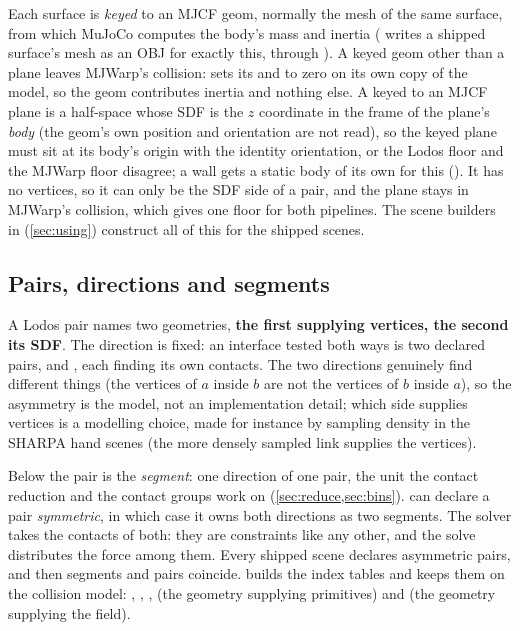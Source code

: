 Each surface is \emph{keyed} to an MJCF geom, normally the mesh of the same surface, from which MuJoCo computes the body's mass and inertia ( writes a shipped surface's mesh as an OBJ for exactly this, through ). A keyed geom other than a plane leaves MJWarp's collision:  sets its  and  to zero on its own copy of the model, so the geom contributes inertia and nothing else. A  keyed to an MJCF plane is a half-space whose SDF is the $z$ coordinate in the frame of the plane's \emph{body} (the geom's own position and orientation are not read), so the keyed plane must sit at its body's origin with the identity orientation, or the Lodos floor and the MJWarp floor disagree; a wall gets a static body of its own for this (). It has no vertices, so it can only be the SDF side of a pair, and the plane stays in MJWarp's collision, which gives one floor for both pipelines. The scene builders in  (\cref{sec:using}) construct all of this for the shipped scenes.

\subsection{Pairs, directions and segments}\label{sec:pairs}

A Lodos pair names two geometries, \textbf{the first supplying vertices, the second its SDF}. The direction is fixed: an interface tested both ways is two declared pairs,  and , each finding its own contacts. The two directions genuinely find different things (the vertices of $a$ inside $b$ are not the vertices of $b$ inside $a$), so the asymmetry is the model, not an implementation detail; which side supplies vertices is a modelling choice, made for instance by sampling density in the SHARPA hand scenes (the more densely sampled link supplies the vertices).

Below the pair is the \emph{segment}: one direction of one pair, the unit the contact reduction and the contact groups work on (\cref{sec:reduce,sec:bins}).  can declare a pair \emph{symmetric}, in which case it owns both directions as two segments. The solver takes the contacts of both: they are constraints like any other, and the solve distributes the force among them. Every shipped scene declares asymmetric pairs, and then segments and pairs coincide.  builds the index tables and keeps them on the collision model: , , ,  (the geometry supplying primitives) and  (the geometry supplying the field).

